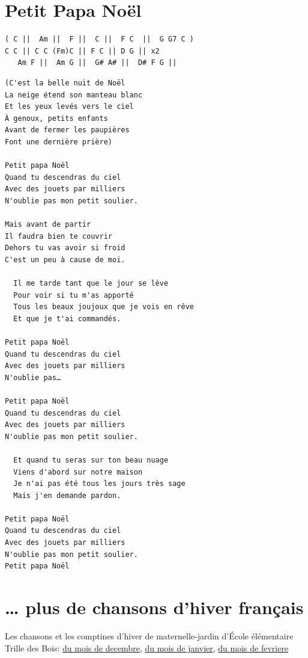 \documentclass[
]{article}
\begin{document}
\hypertarget{petit-papa-nouxebl}{%
\section{Petit Papa Noël}\label{petit-papa-nouxebl}}

\begin{verbatim}
( C ||  Am ||  F ||  C ||  F C  ||  G G7 C )
C C || C C (Fm)C || F C || D G || x2
   Am F ||  Am G ||  G# A# ||  D# F G || 
\end{verbatim}

\begin{verbatim}
(C'est la belle nuit de Noël
La neige étend son manteau blanc
Et les yeux levés vers le ciel
À genoux, petits enfants
Avant de fermer les paupières
Font une dernière prière)

Petit papa Noël
Quand tu descendras du ciel
Avec des jouets par milliers
N'oublie pas mon petit soulier.

Mais avant de partir
Il faudra bien te couvrir
Dehors tu vas avoir si froid
C'est un peu à cause de moi.

  Il me tarde tant que le jour se lève
  Pour voir si tu m'as apporté
  Tous les beaux joujoux que je vois en rêve
  Et que je t'ai commandés.

Petit papa Noël
Quand tu descendras du ciel
Avec des jouets par milliers
N'oublie pas… 

Petit papa Noël
Quand tu descendras du ciel
Avec des jouets par milliers
N'oublie pas mon petit soulier.

  Et quand tu seras sur ton beau nuage
  Viens d'abord sur notre maison
  Je n'ai pas été tous les jours très sage
  Mais j'en demande pardon.

Petit papa Noël
Quand tu descendras du ciel
Avec des jouets par milliers
N'oublie pas mon petit soulier.
Petit papa Noël
\end{verbatim}

\hypertarget{plus-de-chansons-dhiver-franuxe7ais}{%
\section{\ldots{} plus de chansons d'hiver
français}\label{plus-de-chansons-dhiver-franuxe7ais}}

Les chansons et les comptines d'hiver de maternelle-jardin d'École
élémentaire Trille des Bois:
\href{http://ivim.ca/Waldorf/chansons/livre-de-chansons-de-MmeClaire/chansons-4-decembre.pdf}{du
mois de decembre},
\href{http://ivim.ca/Waldorf/chansons/livre-de-chansons-de-MmeClaire/chansons-4a-janvier.pdf}{du
mois de janvier},
\href{http://ivim.ca/Waldorf/chansons/livre-de-chansons-de-MmeClaire/chansons-5-fevrier.pdf}{du
mois de fevriere}
\end{document}
